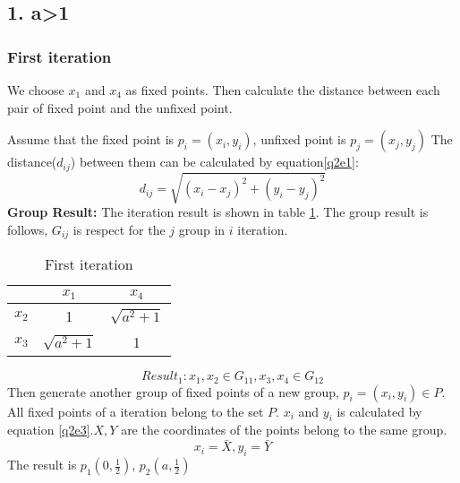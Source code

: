 \documentclass[12pt,letterpaper]{article}
\begin{document}
\subsection*{1. a>1}
\subsubsection*{First iteration}We choose $x_1$ and $x_4$ as fixed points. Then calculate the distance between each pair of fixed point and the unfixed point.
\par Assume that the fixed point is $p_i=(x_i,y_i)$, unfixed point is $p_j=(x_j,y_j)$ The distance($d_{ij}$) between them can be calculated by equation\ref{q2e1}:
\begin{equation}\label{q2e1}
  d_{ij}=\sqrt{\left( x_i-x_j \right) ^2+\left( y_i-y_j \right) ^2}
\end{equation}
{\bf Group Result: }The iteration result is shown in table \ref{first iteration}. The group result is follows, $G_{ij}$ is respect for the $j$ group in $i$ iteration.
\begin{table}[!htbp]
  \centering
  \caption{First iteration}
    \begin{tabular}{|c|c|c|}
   \toprule
            & $x_1$    & $x_4$ \\
    \hline
    $x_2$    & \textcolor[rgb]{1.000, 0.000, 0.000}{1}     & $\sqrt{a^2+1}$ \\
    \hline
    $x_3$    & $\sqrt{a^2+1}$     & \textcolor[rgb]{1.000, 0.000, 0.000}{1} \\
    \bottomrule
    \end{tabular}%
  \label{first iteration}%
\end{table}%

\begin{equation}\label{q2e2}
  Result_1: x_1,x_2\in G_{11}, x_3,x_4\in G_{12}
\end{equation}
Then generate another group of fixed points of a new group, $p_i=\left( x_i,y_i \right) \in P$. All fixed points of a iteration belong to the set $P$. $x_i$ and $y_i$ is calculated by equation \ref{q2e3}.$X,Y$ are the coordinates of the points belong to the same group.
\begin{equation}\label{q2e3}
  x_i=\bar{X}, y_i=\bar{Y}
\end{equation}
The result is $p_1(0,\frac{1}{2})$, $p_2(a,\frac{1}{2})$
\newpage
\end{document}
